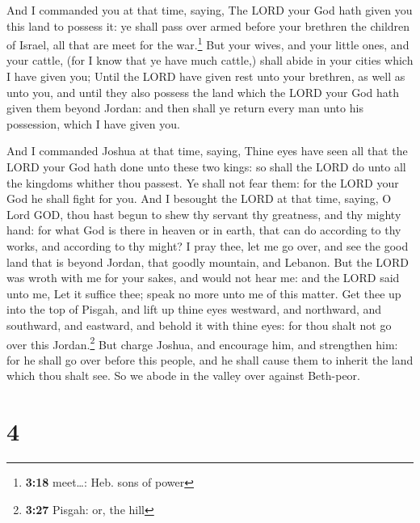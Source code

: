 And I commanded you at that time, saying, The LORD your
God hath given you this land to possess it: ye shall pass over armed
before your brethren the children of Israel, all that are meet for the
war.\footnote{\textbf{3:18} meet\ldots: Heb. sons of power}
 But your wives, and your little ones, and your cattle,
(for I know that ye have much cattle,) shall abide in your cities which
I have given you;  Until the LORD have given rest unto
your brethren, as well as unto you, and until they also possess the land
which the LORD your God hath given them beyond Jordan: and then shall ye
return every man unto his possession, which I have given you.

 And I commanded Joshua at that time, saying, Thine eyes
have seen all that the LORD your God hath done unto these two kings: so
shall the LORD do unto all the kingdoms whither thou passest.
 Ye shall not fear them: for the LORD your God he shall
fight for you.  And I besought the LORD at that time,
saying,  O Lord GOD, thou hast begun to shew thy servant
thy greatness, and thy mighty hand: for what God is there in heaven or
in earth, that can do according to thy works, and according to thy
might?  I pray thee, let me go over, and see the good
land that is beyond Jordan, that goodly mountain, and Lebanon.
 But the LORD was wroth with me for your sakes, and would
not hear me: and the LORD said unto me, Let it suffice thee; speak no
more unto me of this matter.  Get thee up into the top of
Pisgah, and lift up thine eyes westward, and northward, and southward,
and eastward, and behold it with thine eyes: for thou shalt not go over
this Jordan.\footnote{\textbf{3:27} Pisgah: or, the hill}
 But charge Joshua, and encourage him, and strengthen
him: for he shall go over before this people, and he shall cause them to
inherit the land which thou shalt see.  So we abode in
the valley over against Beth-peor.

\hypertarget{section-3}{%
\section{4}\label{section-3}}

